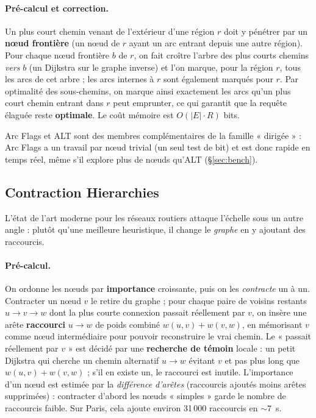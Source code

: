 \paragraph{Pré-calcul et correction.} Un plus court chemin venant de l'extérieur
d'une région $r$ doit y pénétrer par un \textbf{nœud frontière} (un nœud de $r$
ayant un arc entrant depuis une autre région). Pour chaque nœud frontière $b$ de
$r$, on fait croître l'arbre des plus courts chemins \emph{vers} $b$ (un Dijkstra
sur le graphe inverse) et l'on marque, pour la région $r$, tous les arcs de cet
arbre ; les arcs internes à $r$ sont également marqués pour $r$. Par optimalité
des sous-chemins, on marque ainsi exactement les arcs qu'un plus court chemin
entrant dans $r$ peut emprunter, ce qui garantit que la requête élaguée reste
\textbf{optimale}. Le coût mémoire est $O(|E| \cdot R)$ bits.

\medskip

Arc Flags et ALT sont des membres complémentaires de la famille « dirigée » : Arc
Flags a un travail par nœud trivial (un seul test de bit) et est donc rapide en
temps réel, même s'il explore plus de nœuds qu'ALT (\S\ref{sec:bench}).

\subsection{Contraction Hierarchies}
\label{sec:ch}
L'état de l'art moderne pour les réseaux routiers
\citep{geisberger2008ch} attaque l'échelle sous un autre angle : plutôt qu'une
meilleure heuristique, il change le \emph{graphe} en y ajoutant des raccourcis.

\paragraph{Pré-calcul.} On ordonne les nœuds par \textbf{importance} croissante,
puis on les \emph{contracte} un à un. Contracter un nœud $v$ le retire du graphe ;
pour chaque paire de voisins restants $u \to v \to w$ dont la plus courte
connexion passait réellement par $v$, on insère une arête \textbf{raccourci}
$u \to w$ de poids combiné $w(u,v) + w(v,w)$, en mémorisant $v$ comme nœud
intermédiaire pour pouvoir reconstruire le vrai chemin. Le « passait réellement
par $v$ » est décidé par une \textbf{recherche de témoin} locale : un petit
Dijkstra qui cherche un chemin alternatif $u \to w$ évitant $v$ et pas plus long
que $w(u,v)+w(v,w)$ ; s'il en existe un, le raccourci est inutile. L'importance
d'un nœud est estimée par la \emph{différence d'arêtes} (raccourcis ajoutés moins
arêtes supprimées) : contracter d'abord les nœuds « simples » garde le nombre de
raccourcis faible. Sur Paris, cela ajoute environ 31\,000 raccourcis en $\sim
7$~s.

